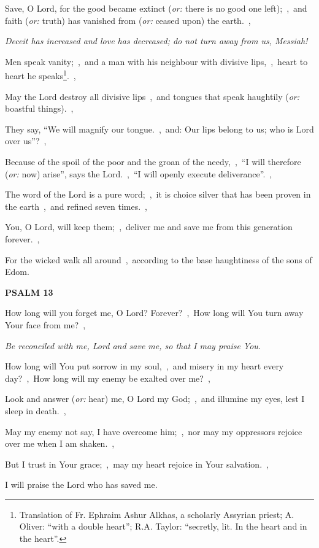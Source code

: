 \documentclass[12pt,twoside,a5paper]{article}
\newcommand{\psalm}[1]{\textbf{PSALM {#1}}\nopagebreak}
\newcommand{\qanona}[1]{{\liturgicalhint{Qanona.} \emph{#1}}}
\newcommand{\translationoption}[1]{\emph{or:} #1}
\begin{document}
\begin{normalparskip}
  Save, O Lord, for the good became extinct (\translationoption{there is no good one left});~\sep\ and faith (\translationoption{truth}) has vanished from (\translationoption{ceased upon}) the earth.~\sep

  \qanona{Deceit has increased and love has decreased; do not turn away from us, Messiah!}

  Men speak vanity;~\sep\ and a man with his neighbour with divisive lips,~\sep\ heart to heart he speaks\footnote{Translation of Fr. Ephraim Ashur Alkhas, a scholarly Assyrian priest; A. Oliver: ``with a double heart''; R.A. Taylor: ``secretly, lit. In the heart and in the heart''.}.~\sep

  May the Lord destroy all divisive lips~\sep\ and tongues that speak haughtily (\translationoption{boastful things}).~\sep

  They say, ``We will magnify our tongue.~\sep\ and: Our lips belong to us; who is Lord over us''?~\sep

  Because of the spoil of the poor and the groan of the needy,~\sep\ ``I will therefore (\translationoption{now}) arise'', says the Lord.~\sep\ ``I will openly execute deliverance''.~\sep

  The word of the Lord is a pure word;~\sep\ it is choice silver that has been proven in the earth~\sep\ and refined seven times.~\sep

  You, O Lord, will keep them;~\sep\ deliver me and save me from this generation forever.~\sep

  For the wicked walk all around~\sep\ according to the base haughtiness of the sons of Edom.
\end{normalparskip}

\psalm{13}

\begin{normalparskip}
  How long will you forget me, O Lord? Forever?~\sep\ How long will You turn away Your face from me?~\sep

  \qanona{Be reconciled with me, Lord and save me, so that I may praise You.}

  How long will You put sorrow in my soul,~\sep\ and misery in my heart every day?~\sep\ How long will my enemy be exalted over me?~\sep

  Look and answer (\translationoption{hear}) me, O Lord my God;~\sep\ and illumine my eyes, lest I sleep in death.~\sep

  May my enemy not say, I have overcome him;~\sep\ nor may my oppressors rejoice over me when I am shaken.~\sep

  But I trust in Your grace;~\sep\ may my heart rejoice in Your salvation.~\sep

  I will praise the Lord who has saved me.
\end{normalparskip}
\end{document}
